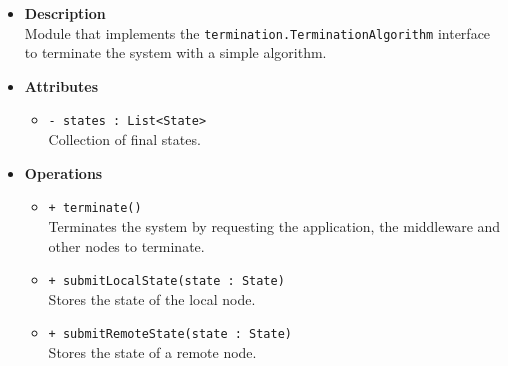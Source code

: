 \FloatBarrier
\begin{itemize}
  \item \textbf{Description} \\
    Module that implements the \texttt{termination.TerminationAlgorithm}
    interface to terminate the system with a simple algorithm.
  \item \textbf{Attributes}
  \begin{itemize}
    \item \texttt{- states : List<State>} \\
    Collection of final states.
  \end{itemize}
  \item \textbf{Operations}
  \begin{itemize}
    \item \texttt{+ terminate()} \\
    Terminates the system by requesting the application, the middleware and
    other nodes to terminate.
    \item \texttt{+ submitLocalState(state : State)} \\
    Stores the state of the local node.
    \item \texttt{+ submitRemoteState(state : State)} \\
    Stores the state of a remote node.
  \end{itemize}
\end{itemize}
